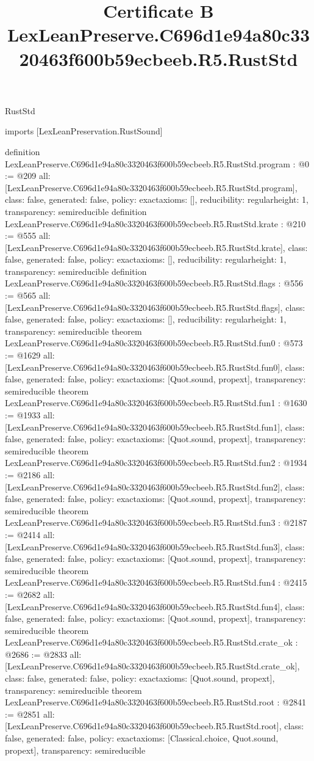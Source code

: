\begin{lexlean}{RustStd}
\title{Certificate B LexLeanPreserve.C696d1e94a80c3320463f600b59ecbeeb.R5.RustStd}
\begin{coremodule}
imports [LexLeanPreservation.RustSound]

definition LexLeanPreserve.C696d1e94a80c3320463f600b59ecbeeb.R5.RustStd.program : @0 := @209 {
  all: [LexLeanPreserve.C696d1e94a80c3320463f600b59ecbeeb.R5.RustStd.program],
  class: false,
  generated: false,
  policy: exact{axioms: []},
  reducibility: regular{height: 1},
  transparency: semireducible
}
definition LexLeanPreserve.C696d1e94a80c3320463f600b59ecbeeb.R5.RustStd.krate : @210 := @555 {
  all: [LexLeanPreserve.C696d1e94a80c3320463f600b59ecbeeb.R5.RustStd.krate],
  class: false,
  generated: false,
  policy: exact{axioms: []},
  reducibility: regular{height: 1},
  transparency: semireducible
}
definition LexLeanPreserve.C696d1e94a80c3320463f600b59ecbeeb.R5.RustStd.flags : @556 := @565 {
  all: [LexLeanPreserve.C696d1e94a80c3320463f600b59ecbeeb.R5.RustStd.flags],
  class: false,
  generated: false,
  policy: exact{axioms: []},
  reducibility: regular{height: 1},
  transparency: semireducible
}
theorem LexLeanPreserve.C696d1e94a80c3320463f600b59ecbeeb.R5.RustStd.fun0 : @573 := @1629 {
  all: [LexLeanPreserve.C696d1e94a80c3320463f600b59ecbeeb.R5.RustStd.fun0],
  class: false,
  generated: false,
  policy: exact{axioms: [Quot.sound, propext]},
  transparency: semireducible
}
theorem LexLeanPreserve.C696d1e94a80c3320463f600b59ecbeeb.R5.RustStd.fun1 : @1630 := @1933 {
  all: [LexLeanPreserve.C696d1e94a80c3320463f600b59ecbeeb.R5.RustStd.fun1],
  class: false,
  generated: false,
  policy: exact{axioms: [Quot.sound, propext]},
  transparency: semireducible
}
theorem LexLeanPreserve.C696d1e94a80c3320463f600b59ecbeeb.R5.RustStd.fun2 : @1934 := @2186 {
  all: [LexLeanPreserve.C696d1e94a80c3320463f600b59ecbeeb.R5.RustStd.fun2],
  class: false,
  generated: false,
  policy: exact{axioms: [Quot.sound, propext]},
  transparency: semireducible
}
theorem LexLeanPreserve.C696d1e94a80c3320463f600b59ecbeeb.R5.RustStd.fun3 : @2187 := @2414 {
  all: [LexLeanPreserve.C696d1e94a80c3320463f600b59ecbeeb.R5.RustStd.fun3],
  class: false,
  generated: false,
  policy: exact{axioms: [Quot.sound, propext]},
  transparency: semireducible
}
theorem LexLeanPreserve.C696d1e94a80c3320463f600b59ecbeeb.R5.RustStd.fun4 : @2415 := @2682 {
  all: [LexLeanPreserve.C696d1e94a80c3320463f600b59ecbeeb.R5.RustStd.fun4],
  class: false,
  generated: false,
  policy: exact{axioms: [Quot.sound, propext]},
  transparency: semireducible
}
theorem LexLeanPreserve.C696d1e94a80c3320463f600b59ecbeeb.R5.RustStd.crate_ok : @2686 := @2833 {
  all: [LexLeanPreserve.C696d1e94a80c3320463f600b59ecbeeb.R5.RustStd.crate_ok],
  class: false,
  generated: false,
  policy: exact{axioms: [Quot.sound, propext]},
  transparency: semireducible
}
theorem LexLeanPreserve.C696d1e94a80c3320463f600b59ecbeeb.R5.RustStd.root : @2841 := @2851 {
  all: [LexLeanPreserve.C696d1e94a80c3320463f600b59ecbeeb.R5.RustStd.root],
  class: false,
  generated: false,
  policy: exact{axioms: [Classical.choice, Quot.sound, propext]},
  transparency: semireducible
}


\end{coremodule}
\end{lexlean}
